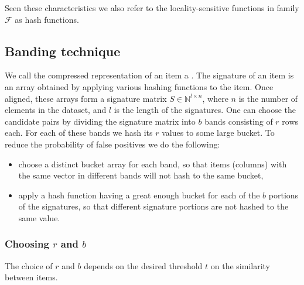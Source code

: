 Seen these characteristics we also refer to the locality-sensitive functions in family $\mathcal{F}$ as hash functions. 

\subsection{Banding technique}\label{bandingTechnique}
We call the compressed representation of an item a . The signature of an item is an array obtained by applying various hashing functions to the item. Once aligned, these arrays form a signature matrix $S\in\mathbb{N}^{l\times n}$, where $n$ is the number of elements in the dataset, and $l$ is the length of the signatures. One can choose the candidate pairs by dividing the signature matrix into $b$ bands consisting of $r$ rows each. For each of these bands we hash its $r$ values to some large bucket. To reduce the probability of false positives we do the following:
\begin{itemize}
    \item choose a distinct bucket array for each band, so that items (columns) with the same vector in different bands will not hash to the same bucket,
    \item apply a hash function having a great enough bucket for each of the $b$ portions of the signatures, so that different signature portions are not hashed to the same value.
\end{itemize}


\subsubsection{Choosing $r$ and $b$}\label{choosingCandidatePairs}
The choice of $r$ and $b$ depends on the desired threshold $t$ on the similarity between items. 

